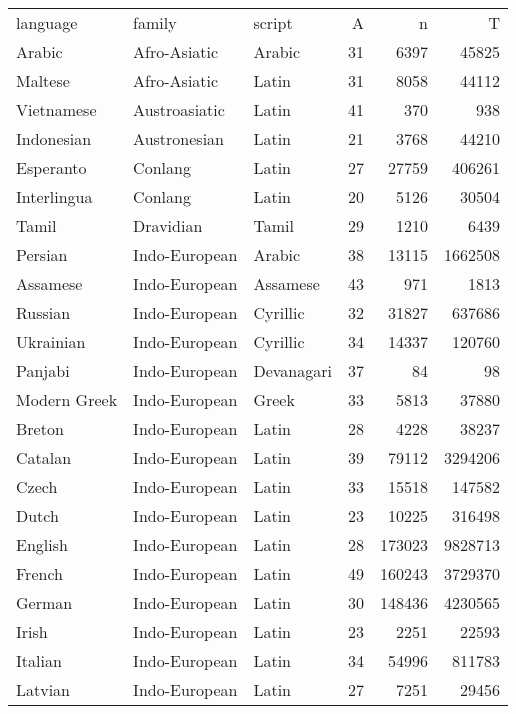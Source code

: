 \begin{table}[ht]
\centering
\begin{tabular}{lllrrr}
 language & family & script & A & n & T \\ 
 Arabic & Afro-Asiatic & Arabic &  31 & 6397 & 45825 \\ 
  Maltese & Afro-Asiatic & Latin &  31 & 8058 & 44112 \\ 
  Vietnamese & Austroasiatic & Latin &  41 & 370 & 938 \\ 
  Indonesian & Austronesian & Latin &  21 & 3768 & 44210 \\ 
  Esperanto & Conlang & Latin &  27 & 27759 & 406261 \\ 
  Interlingua & Conlang & Latin &  20 & 5126 & 30504 \\ 
  Tamil & Dravidian & Tamil &  29 & 1210 & 6439 \\ 
  Persian & Indo-European & Arabic &  38 & 13115 & 1662508 \\ 
  Assamese & Indo-European & Assamese &  43 & 971 & 1813 \\ 
  Russian & Indo-European & Cyrillic &  32 & 31827 & 637686 \\ 
  Ukrainian & Indo-European & Cyrillic &  34 & 14337 & 120760 \\ 
  Panjabi & Indo-European & Devanagari &  37 &  84 &  98 \\ 
  Modern Greek & Indo-European & Greek &  33 & 5813 & 37880 \\ 
  Breton & Indo-European & Latin &  28 & 4228 & 38237 \\ 
  Catalan & Indo-European & Latin &  39 & 79112 & 3294206 \\ 
  Czech & Indo-European & Latin &  33 & 15518 & 147582 \\ 
  Dutch & Indo-European & Latin &  23 & 10225 & 316498 \\ 
  English & Indo-European & Latin &  28 & 173023 & 9828713 \\ 
  French & Indo-European & Latin &  49 & 160243 & 3729370 \\ 
  German & Indo-European & Latin &  30 & 148436 & 4230565 \\ 
  Irish & Indo-European & Latin &  23 & 2251 & 22593 \\ 
  Italian & Indo-European & Latin &  34 & 54996 & 811783 \\ 
  Latvian & Indo-European & Latin &  27 & 7251 & 29456 \\ 

\end{tabular}
\end{table}
